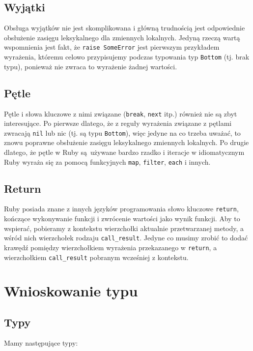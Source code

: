 \documentclass[declaration,shortabstract,mgr]{iithesis}
\begin{document}
\section{Wyjątki}

Obsługa wyjątków nie jest skomplikowana i główną trudnością jest odpowiednie obsłużenie zasięgu leksykalnego dla zmiennych lokalnych. Jedyną rzeczą wartą wspomnienia jest fakt, że \texttt{raise SomeError} jest pierwszym przykładem wyrażenia, któremu celowo przypisujemy podczas typowania typ \texttt{Bottom} (tj. brak typu), ponieważ nie zwraca to wyrażenie żadnej wartości.

\section{Pętle}

Pętle i słowa kluczowe z nimi związane (\texttt{break}, \texttt{next} itp.) również nie są zbyt interesujące. Po pierwsze dlatego, że z reguły wyrażenia związane z pętlami zwracają \texttt{nil} lub nic (tj. są typu \texttt{Bottom}), więc jedyne na co trzeba uważać, to znowu poprawne obsłużenie zasięgu leksykalnego zmiennych lokalnych. Po drugie dlatego, że pętle w Ruby są używane bardzo rzadko i iteracje w idiomatycznym Ruby wyraża się za pomocą funkcyjnych \texttt{map}, \texttt{filter}, \texttt{each} i innych.

\section{Return}

Ruby posiada znane z innych języków programowania słowo kluczowe \texttt{return}, kończące wykonywanie funkcji i zwrócenie wartości jako wynik funkcji. Aby to wspierać, pobieramy z kontekstu wierzchołki aktualnie przetwarzanej metody, a wśród nich wierzchołek rodzaju \texttt{call\_result}. Jedyne co musimy zrobić to dodać krawędź pomiędzy wierzchołkiem wyrażenia przekazanego w \texttt{return}, a wierzchołkiem \texttt{call\_result} pobranym wcześniej z kontekstu.


\chapter{Wnioskowanie typu}

\section{Typy}

Mamy następujące typy:
\end{document}
